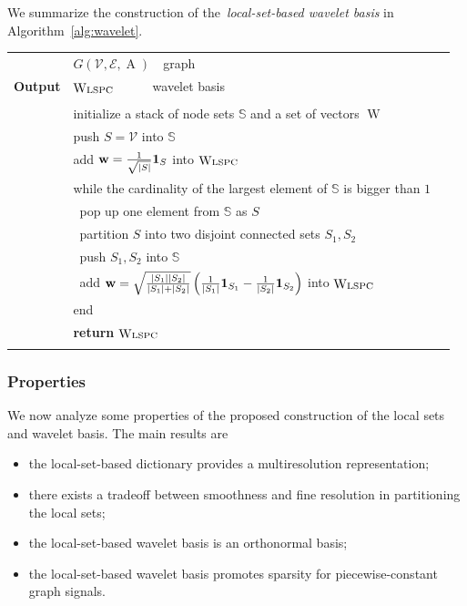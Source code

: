 \documentclass[journal,twocolumn,10pt]{IEEEtran}
\theoremstyle{definition}
\def\w{\mathbf{w}}
\def\V{\mathcal{V}}
\def\E{\mathcal{E}}
\DeclareMathOperator{\Adj}{A}
\DeclareMathOperator{\W}{W}
\begin{document}
We summarize the construction of  the~\emph{local-set-based wavelet basis} in Algorithm~\ref{alg:wavelet}.
\begin{algorithm}[h]
  \footnotesize
  \caption{\label{alg:wavelet} Local-set-based  Wavelet Basis Construction }
  \begin{tabular}{@{}lll@{}}
    \addlinespace[1mm]
   {\bf Input} 
      & $G(\V, \E, \Adj )$~~graph \\
     {\bf Output}  
      & $\W_{\rm LSPC}$~~~~~~wavelet basis \\
    \addlinespace[2mm]
    {\bf Function} & &\\
    & initialize a stack of node sets $\mathbb{S}$ and a set of vectors $\W$ \\
    & push $S = \V$ into $\mathbb{S}$ \\ 
    & add $\w = \frac{1}{ \sqrt{|S|}} {\bf 1}_S$ into $\W_{\rm LSPC}$ \\
    & while the cardinality of the largest element of $\mathbb{S}$ is bigger than $1$  \\ 
    &~pop up one element from $\mathbb{S}$ as $S$ \\
    &~partition $S$ into two disjoint connected sets $S_1, S_2$ \\
    &~push $S_1, S_2$ into $\mathbb{S}$ \\
    &~add $\w = \sqrt{ \frac{|S_1| |S_2|}{|S_1|+|S_2|}} \left(  \frac{1}{|S_1|} {\bf 1}_{S_1} - \frac{1}{|S_2|} {\bf 1}_{S_2}\right)$ into $\W_{\rm LSPC}$\\
    & end \\
    & {\bf return} $\W_{\rm LSPC}$ \\  
     \addlinespace[1mm]
  \end{tabular}
\end{algorithm}


\subsubsection{Properties}
We now analyze some properties of the proposed construction of the local sets and wavelet basis. The main results are
\begin{itemize}
\item  the local-set-based dictionary provides a multiresolution representation;
\item there exists a tradeoff between smoothness and fine resolution in partitioning the local sets;
\item  the local-set-based wavelet basis is an orthonormal basis;
\item the local-set-based wavelet basis promotes sparsity for piecewise-constant graph signals.
\end{itemize}
\end{document}
